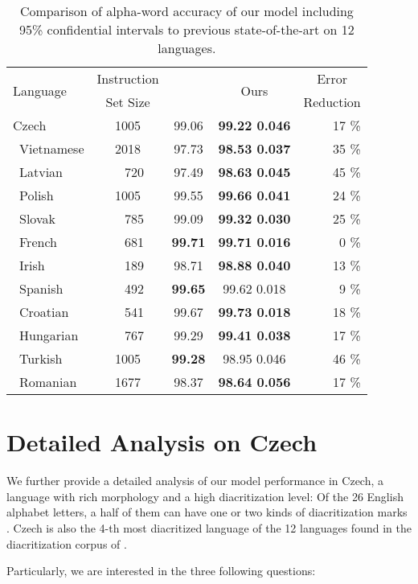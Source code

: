 \documentclass{pbmlarxiv}
\begin{document}
\begin{table}[t]
    \centering
\begin{tabular}{l cccr}\toprule
    \multirow{2}{*}{Language} & Instruction & \multirow{2}{*}{\citet{naplava2018diacritics}} & \multirow{2}{*}{Ours} & \multicolumn{1}{c}{Error} \\
    & Set Size & & & Reduction \\\midrule
Czech   &1005&99.06&\textbf{99.22 0.046} & 17 \% \\\
Vietnamese  &2018&97.73&\textbf{98.53 0.037} & 35 \%	\\\
Latvian &~~720&97.49&\textbf{98.63 0.045} & 45 \% \\\
Polish  &1005&99.55&\textbf{99.66 0.041} & 24 \%\\\
Slovak  &~~785&99.09&\textbf{99.32 0.030} & 25 \%\\\
French  &~~681&\textbf{99.71}&\textbf{99.71 0.016} & 0 \%\\\
Irish   &~~189&98.71&\textbf{98.88 0.040} & 13 \% \\\
Spanish   &~~492&\textbf{99.65}&99.62 0.018 &  9 \%\\\
Croatian    &~~541&99.67&\textbf{99.73 0.018} & 18 \%\\\
Hungarian   &~~767&99.29&\textbf{99.41 0.038} & 17 \%\\\
Turkish &1005&\textbf{99.28}&98.95 0.046 &  46 \% \\\
Romanian    &1677&98.37&\textbf{98.64 0.056} & 17 \% \\\bottomrule
\end{tabular}
    \caption{Comparison of alpha-word accuracy of our model including 95\% confidential intervals to previous state-of-the-art on 12 languages.}
    \label{table:inter_language_results}
\end{table}


\section{Detailed Analysis on Czech}

We further provide a detailed analysis of our model performance in Czech, a language with rich morphology and a high diacritization level: Of the 26 English alphabet letters, a half of them can have one or two kinds of diacritization marks \cite{NovyEncyklopedickySlovnik}. Czech is also the 4-th most diacritized language of the 12 languages found in the diacritization corpus of \citet{naplava2018diacritics}. 

Particularly, we are interested in the three following questions:
\end{document}
